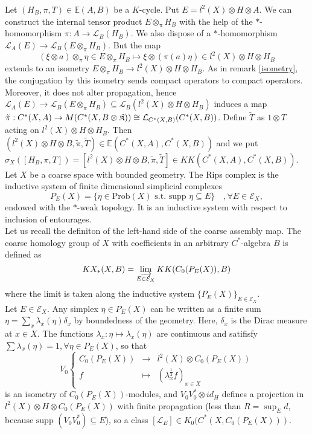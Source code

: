 Let $(H_B,\pi,T)\in\mathbb E(A,B)$ be a $K$-cycle. Put $E = l^2(X)\otimes H\otimes A$. We can construct the internal tensor product  $E\otimes_\pi H_B$ with the help of the $*$-homomorphism $\pi : A \rightarrow \mathcal L_B(H_B)$. We also dispose of a $*$-homomorphism $\mathcal L_A(E)\rightarrow \mathcal L_B(E\otimes_\pi H_B)$. But the map 
\[(\xi\otimes a)\otimes_\pi \eta \in E\otimes_\pi H_B \mapsto \xi\otimes (\pi(a)\eta)\in l^2(X)\otimes H\otimes H_B \] %
extends to an isometry $E\otimes_\pi H_B \rightarrow l^2(X)\otimes H\otimes  H_B$. As in remark \ref{isometry}, the conjugation by this isometry sends compact operators to compact operators. Moreover, it does not alter propagation, hence $\mathcal L_A(E)\rightarrow \mathcal L_B(E\otimes_\pi H_B)\subseteq \mathcal L_B(l^2(X)\otimes H\otimes H_B)$ induces a map $\tilde \pi : C^*(X,A)\rightarrow \mathcal \mathcal M(C^*(X,B\otimes\mathfrak K))\cong \mathcal L_{C^*(X,B)}(C^*(X,B))$. Define $\tilde T$ as $1\otimes T$ acting on $l^2(X)\otimes H \otimes H_B$. Then $(l^2(X)\otimes H\otimes B,\tilde \pi,\tilde T)\in \mathbb E(C^*(X,A),C^*(X,B))$ and we put $\sigma_X([H_B,\pi,T])=[l^2(X)\otimes H\otimes B,\tilde \pi,\tilde T]\in KK(C^*(X,A),C^*(X,B))$.\\

Let $X$ be a coarse space with bounded geometry. The Rips complex is the inductive system of finite dimensional simplicial complexes
\[P_E(X)=\{\eta\in \text{Prob}(X)\text{ s.t. supp }\eta\subseteq E\}\quad,\forall E\in \mathcal E_X,\]
endowed with the $*$-weak topology. It is an inductive system with respect to inclusion of entourages.\\
 
Let us recall the definiton of the left-hand side of the coarse assembly map. The coarse homology group of $X$ with coefficients in an arbitrary $C^*$-algebra $B$ is defined as 
\[KX_*(X,B)=\varinjlim_{E\in \mathcal E_X} KK(C_0(P_E(X)),B)\]
where the limit is taken along the inductive system $\{P_E(X)\}_{E\in\mathcal E_X}$. \\

Let $E\in \mathcal E_X$. Any simplex $\eta\in P_E(X)$ can be written as a finite sum $\eta=\sum_x \lambda_x(\eta)\delta_x$ by boundedness of the geometry. Here, $\delta_x$ is the Dirac measure at $x\in X$. The functions $\lambda_x :\eta\mapsto \lambda_x(\eta)$ are continuous and satifisfy $\sum\lambda_x(\eta) = 1,\forall\eta\in P_E(X)$, so that
\[V_0\left\{\begin{array}{rcl} 
 C_0(P_E(X)) & \rightarrow 	& l^2(X)\otimes C_0(P_E(X)) 		\\ 
 f           & \mapsto 		& (\lambda_x^{\frac{1}{2}}f)_{x\in X} 
\end{array}\right.\] 
is an isometry of $C_0(P_E(X))$-modules, and $V_0V_0^*\otimes id_H$ defines a projection in $l^2(X)\otimes H\otimes C_0(P_E(X))$ with finite propagation (less than $R= \sup_E d$, because $\text{supp }(V_0 V_0^*)\subseteq E$), so a class $[\mathcal L_E]\in K_0(C^*(X,C_0(P_E(X)))$.\\

